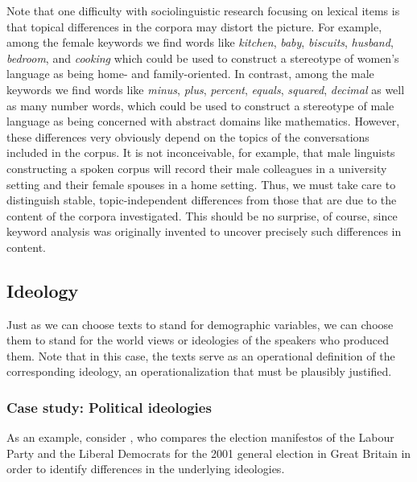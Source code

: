 Note that one difficulty with sociolinguistic  research focusing on lexical items is that topical differences in the corpora may distort the picture. For example, among the female keywords  we find words like \textit{kitchen}, \textit{baby}, \textit{biscuits}, \textit{husband}, \textit{bedroom}, and \textit{cooking} which could be used to construct a stereotype of women's language as being home- and family\hyp{}oriented. In contrast, among the male keywords we find words like \textit{minus}, \textit{plus}, \textit{percent}, \textit{equals}, \textit{squared}, \textit{decimal} as well as many number words, which could be used to construct a stereotype of male language as being concerned with abstract domains like mathematics. However, these differences very obviously depend on the topics of the conversations  included in the corpus. It is not inconceivable, for example, that male linguists constructing a spoken  corpus will record their male colleagues in a university setting and their female spouses in a home setting. Thus, we must take care to distinguish stable, topic\hyp{}independent differences from those that are due to the content of the corpora investigated. This should be no surprise, of course, since keyword  analysis was originally invented to uncover precisely such differences in content.

\subsection{Ideology}
\label{sec:ideology}

Just as we can choose texts to stand for demographic  variables, we can choose them to stand for the world views or ideologies  of the speakers who produced them. Note that in this case, the texts serve as an operational  definition of the corresponding ideology, an operationalization that must be plausibly justified.

\subsubsection{Case study: Political ideologies}
\label{sec:politicalideologies}

As an example, consider \citet{rayson_key_2008}, who compares the election manifestos of the Labour Party and the Liberal Democrats for the 2001 general election in Great Britain in order to identify differences in the underlying  ideologies.

